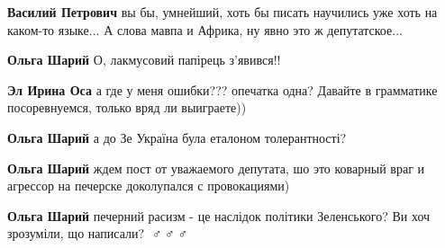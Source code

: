 \begin{itemize}
\begin{itemize}
 
\textbf{Василий Петрович} вы бы, умнейший, хоть бы писать научились уже хоть на каком-то языке... А слова мавпа и Африка, ну явно это ж депутатское...

 
\textbf{Ольга Шарий} О, лакмусовий папірець з'явився!!

 
\textbf{Эл Ирина Оса} а где у меня ошибки??? опечатка одна? Давайте в грамматике посоревнуемся, только вряд ли выиграете))

 
\textbf{Ольга Шарий} а до Зе Україна була еталоном толерантності?

 
\textbf{Ольга Шарий} ждем пост от уважаемого депутата, шо это коварный враг и агрессор на печерске доколупался с провокациями)

 
\textbf{Ольга Шарий} печерний расизм - це наслідок політики Зеленського? Ви хоч зрозуміли, що написали? 🤦♂️🤦♂️🤦♂️


\end{itemize}
\end{itemize}
